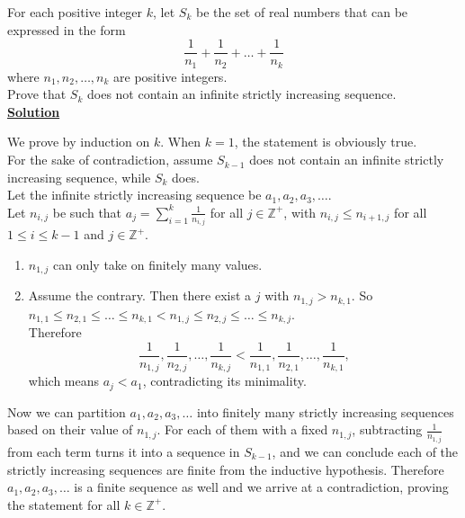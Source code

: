 \documentclass{article}
\begin{document}
For each positive integer $k$, let $S_k$ be the set of real numbers that can be expressed in the form
$$\frac{1}{n_1}+\frac{1}{n_2}+\dots+\frac{1}{n_k}$$
where $n_1,n_2,\dots,n_k$ are positive integers.\\
Prove that $S_k$ does not contain an infinite strictly increasing sequence.\\

\underline{\textbf{Solution}}

We prove by induction on $k$. When $k=1$, the statement is obviously true.\\
For the sake of contradiction, assume $S_{k-1}$ does not contain an infinite strictly increasing sequence, while $S_k$ does.\\
Let the infinite strictly increasing sequence be $a_1,a_2,a_3,\dots$.\\
Let $n_{i,j}$ be such that $a_j=\sum_{i=1}^{k}\frac{1}{n_{i,j}}$ for all $j\in\mathbb{Z}^{+}$, with $n_{i,j}\leq n_{i+1,j}$ for all $1\leq i\leq k-1$ and $j\in\mathbb{Z}^{+}$.

\begin{enumerate}[label=\underline{Claim:}, leftmargin=*]
\item
$n_{1,j}$ can only take on finitely many values.

\item[\underline{Proof:}]
Assume the contrary. Then there exist a $j$ with $n_{1,j}>n_{k,1}$. So $n_{1,1}\leq n_{2,1}\leq\dots\leq n_{k,1}<n_{1,j}\leq n_{2,j}\leq\dots\leq n_{k,j}$.\\
Therefore $$\frac{1}{n_{1,j}},\frac{1}{n_{2,j}},\dots,\frac{1}{n_{k,j}}<\frac{1}{n_{1,1}},\frac{1}{n_{2,1}},\dots,\frac{1}{n_{k,1}},$$
which means $a_j<a_1$, contradicting its minimality.

\end{enumerate}

Now we can partition $a_1,a_2,a_3,\dots$ into finitely many strictly increasing sequences based on their value of $n_{1,j}$. For each of them with a fixed $n_{1,j}$, subtracting $\frac{1}{n_{1,j}}$ from each term turns it into a sequence in $S_{k-1}$, and we can conclude each of the strictly increasing sequences are finite from the inductive hypothesis. Therefore $a_1,a_2,a_3,\dots$ is a finite sequence as well and we arrive at a contradiction, proving the statement for all $k\in\mathbb{Z}^{+}$.
\end{document}
